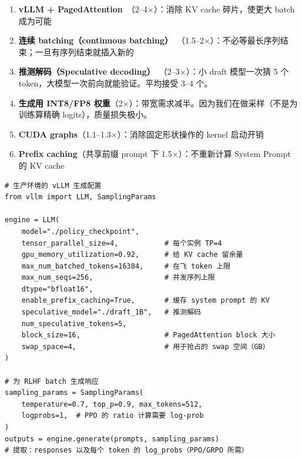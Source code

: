 \begin{enumerate}
  \item \textbf{vLLM + PagedAttention}~\cite{kwon2023efficient}（2--4$\times$）：消除 KV cache 碎片，使更大 batch 成为可能
  \item \textbf{连续 batching（continuous batching）}~\cite{yu2022orca}（1.5--2$\times$）：不必等最长序列结束；一旦有序列结束就插入新的
  \item \textbf{推测解码（Speculative decoding）}~\cite{leviathan2023fast}（2--3$\times$）：小 draft 模型一次猜 5 个 token，大模型一次前向就能验证。平均接受 3--4 个。
  \item \textbf{生成用 INT8/FP8 权重}（2$\times$）：带宽需求减半。因为我们在做采样（不是为训练算精确 logits），质量损失极小。
  \item \textbf{CUDA graphs}（1.1--1.3$\times$）：消除固定形状操作的 kernel 启动开销
  \item \textbf{Prefix caching}（共享前缀 prompt 下 1.5$\times$）：不重新计算 System Prompt 的 KV cache
\end{enumerate}

\begin{lstlisting}[style=pythonstyle]
# 生产环境的 vLLM 生成配置
from vllm import LLM, SamplingParams

engine = LLM(
    model="./policy_checkpoint",
    tensor_parallel_size=4,           # 每个实例 TP=4
    gpu_memory_utilization=0.92,      # 给 KV cache 留余量
    max_num_batched_tokens=16384,     # 在飞 token 上限
    max_num_seqs=256,                 # 并发序列上限
    dtype="bfloat16",
    enable_prefix_caching=True,       # 缓存 system prompt 的 KV
    speculative_model="./draft_1B",   # 推测解码
    num_speculative_tokens=5,
    block_size=16,                    # PagedAttention block 大小
    swap_space=4,                     # 用于抢占的 swap 空间（GB）
)

# 为 RLHF batch 生成响应
sampling_params = SamplingParams(
    temperature=0.7, top_p=0.9, max_tokens=512,
    logprobs=1,  # PPO 的 ratio 计算需要 log-prob
)
outputs = engine.generate(prompts, sampling_params)
# 提取：responses 以及每个 token 的 log_probs（PPO/GRPO 所需）
\end{lstlisting}

